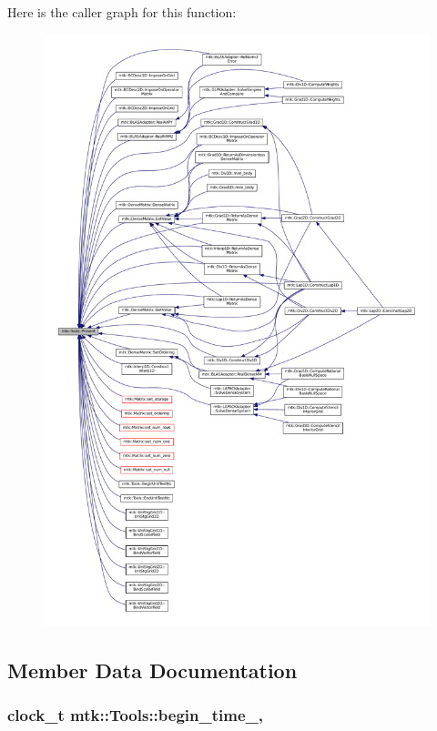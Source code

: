 Here is the caller graph for this function\+:\nopagebreak
\begin{figure}[H]
\begin{center}
\leavevmode
\includegraphics[width=350pt]{classmtk_1_1Tools_afe5bb096309258e2e72503fd7b41c7e0_icgraph}
\end{center}
\end{figure}




\subsection{Member Data Documentation}
\hypertarget{classmtk_1_1Tools_a4bd58d08397db42271ed9e2d3ecc9963}{
\subsubsection[{begin\+\_\+time\+\_\+}]{\setlength{\rightskip}{0pt plus 5cm}clock\+\_\+t mtk\+::\+Tools\+::begin\+\_\+time\+\_\+\hspace{0.3cm}{\ttfamily [static]}, {\ttfamily [private]}}}\label{classmtk_1_1Tools_a4bd58d08397db42271ed9e2d3ecc9963}


